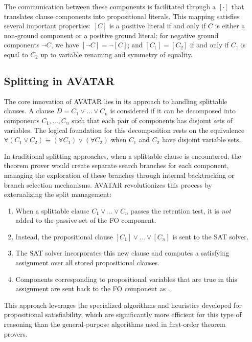 The communication between these components is facilitated through a  \([\cdot]\) that translates clause components into propositional literals.
This mapping satisfies several important properties: \([C]\) is a positive literal if and only if \(C\) is either a non-ground component or a positive ground literal; for negative ground components \(\neg C\), we have \([\neg C] = \neg[C]\); and \([C_1] = [C_2]\) if and only if \(C_1\) is equal to \(C_2\) up to variable renaming and symmetry of equality.

\subsection{Splitting in AVATAR}\label{subsec:avatar-splitting}

The core innovation of AVATAR lies in its approach to handling splittable clauses.
A clause \(D = C_1 \lor \ldots \lor C_n\) is considered  if it can be decomposed into components \(C_1, \ldots, C_n\) such that each pair of components has disjoint sets of variables.
The logical foundation for this decomposition rests on the equivalence \(\forall(C_1 \lor C_2) \equiv (\forall C_1) \lor (\forall C_2)\) when \(C_1\) and \(C_2\) have disjoint variable sets.

In traditional splitting approaches, when a splittable clause is encountered, the theorem prover would create separate search branches for each component, managing the exploration of these branches through internal backtracking or branch selection mechanisms.
AVATAR revolutionizes this process by externalizing the split management:

\begin{enumerate}
  \item When a splittable clause \(C_1 \lor \ldots \lor C_n\) passes the retention test, it is \emph{not} added to the passive set of the FO component.
  \item Instead, the propositional clause \([C_1] \lor \ldots \lor [C_n]\) is sent to the SAT solver.
  \item The SAT solver incorporates this new clause and computes a satisfying assignment over all stored propositional clauses.
  \item Components corresponding to propositional variables that are true in this assignment are sent back to the FO component as .
\end{enumerate}

This approach leverages the specialized algorithms and heuristics developed for propositional satisfiability, which are significantly more efficient for this type of reasoning than the general-purpose algorithms used in first-order theorem provers.

